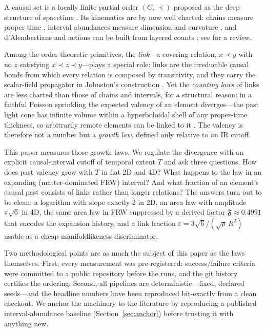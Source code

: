 \documentclass[11pt,a4paper]{article}
\begin{document}
A causal set is a locally finite partial order $(C,\prec)$ proposed as the
deep structure of spacetime \cite{BLMS1987}. Its kinematics are by now well
charted: chains measure proper time \cite{BB1991}, interval abundances measure
dimension and curvature \cite{GlaserSurya2013}, and d'Alembertians and actions
can be built from layered counts \cite{BenincasaDowker2010}; see
\cite{Surya2019} for a review.

Among the order-theoretic primitives, the \emph{link}---a covering relation,
$x \prec y$ with no $z$ satisfying $x \prec z \prec y$---plays a special role:
links are the irreducible causal bonds from which every relation is composed
by transitivity, and they carry the scalar-field propagator in Johnston's
construction \cite{Johnston2008,Johnston2022,Johnston2025}. Yet the
\emph{counting laws} of links are less charted than those of chains and
intervals, for a structural reason: in a faithful Poisson sprinkling the
expected valency of an element diverges---the past light cone has infinite
volume within a hyperboloidal shell of any proper-time thickness, so
arbitrarily remote elements can be linked to it \cite{Surya2019}. The valency
is therefore not a number but a \emph{growth law}, defined only relative to an
IR cutoff.

This paper measures those growth laws. We regulate the divergence with an
explicit causal-interval cutoff of temporal extent $T$ and ask three
questions. How does past valency grow with $T$ in flat 2D and 4D? What happens
to the law in an expanding (matter-dominated FRW) interval? And what fraction
of an element's causal past consists of links rather than longer relations?
The answers turn out to be clean: a logarithm with slope exactly 2 in 2D, an
area law with amplitude $\pi\sqrt{6}$ in 4D, the same area law in FRW
suppressed by a derived factor $\mathfrak{F}\approx 0.4991$ that encodes the
expansion history, and a link fraction
$\varepsilon = 3\sqrt{6}/(\sqrt{\rho}\,R^{2})$ usable as a cheap
manifoldlikeness discriminator.

Two methodological points are as much the subject of this paper as the laws
themselves. First, every measurement was pre-registered: success/failure
criteria were committed to a public repository before the runs, and the git
history certifies the ordering. Second, all pipelines are
deterministic---fixed, declared seeds---and the headline numbers have been
reproduced bit-exactly from a clean checkout. We anchor the machinery to the
literature by reproducing a published interval-abundance baseline
(Section~\ref{sec:anchor}) before trusting it with anything new.
\end{document}
